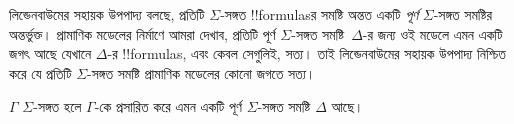 \documentclass[../../../include/open-logic-section]{subfiles}
\begin{document}


লিন্ডেনবাউমের সহায়ক উপপাদ্য বলছে, প্রতিটি $\Sigma$-সঙ্গত !!{formula}sর সমষ্টি অন্তত একটি \emph{পূর্ণ} $\Sigma$-সঙ্গত সমষ্টির অন্তর্ভুক্ত। প্রামাণিক মডেলের নির্মাণে আমরা দেখাব, প্রতিটি পূর্ণ $\Sigma$-সঙ্গত সমষ্টি~$\Delta$-র জন্য ওই মডেলে এমন একটি জগৎ আছে যেখানে $\Delta$-র !!{formula}s, এবং কেবল সেগুলিই, সত্য। তাই লিন্ডেনবাউমের সহায়ক উপপাদ্য নিশ্চিত করে যে প্রতিটি $\Sigma$-সঙ্গত সমষ্টি প্রামাণিক মডেলের কোনো জগতে সত্য।

\begin{thm}[লিন্ডেনবাউমের সহায়ক উপপাদ্য]
  $\Gamma$ $\Sigma$-সঙ্গত হলে $\Gamma$-কে প্রসারিত করে এমন একটি পূর্ণ $\Sigma$-সঙ্গত সমষ্টি $\Delta$ আছে।
\end{thm}
\end{document}
